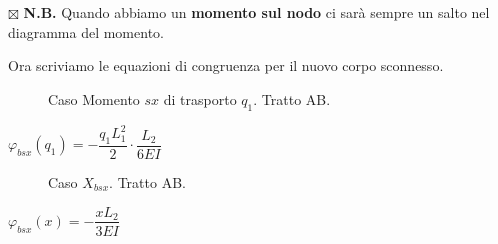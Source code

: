 \documentclass[a4paper,12pt, oneside]{book}
\begin{document}
	$\boxtimes$ \textbf{N.B.} Quando abbiamo un \textbf{momento sul nodo} ci sarà sempre un salto nel diagramma del momento.
	
	Ora scriviamo le equazioni di congruenza per il nuovo corpo sconnesso.
	
	\begin{figure}[H]
		\centering
		\caption{Caso Momento $sx$ di trasporto $q_1$. Tratto AB.}
		\label{fig:appappbnesjsedfdkbdj}
	\end{figure}
	
	$ \varphi_{bsx}(q_1)=-\dfrac{q_1 L_1^{2}}{2}\cdot \dfrac{L_2}{6EI}$
	
	\begin{figure}[H]
		\centering
		\hspace*{1.6cm}
		\caption{Caso $X_{bsx}$. Tratto AB.}
		\label{fig:appappbneqwedfsewwedj}
	\end{figure}
	
	$ \varphi_{bsx}(x)=-\dfrac{xL_2}{3EI}$
	
\end{document}
